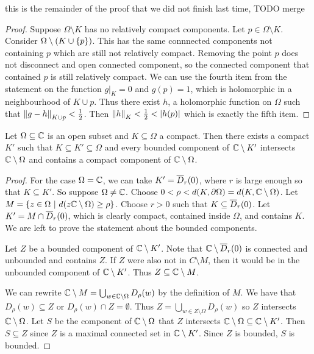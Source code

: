 
this is the remainder of the proof that we did not finish last time, TODO merge
\begin{proof}
    Suppose $\Omega \setminus K$ has no relatively compact components. Let $p \in \Omega \setminus K$. Consider $\Omega \setminus (K \cup \left\{p\right\})$. This has the same connnected components not containing $p$ which are still not relatively compact. Removing the point $p$ does not disconnect and open connected component, so the connected component that contained $p$ is still relatively compact. We can use the fourth item from the statement on the function $g|_K = 0$ and $g(p) = 1$, which is holomorphic in a neighbourhood of $K \cup p$. Thus there exist $h$, a holomorphic function on $\Omega$ such that $\left\lVert g - h\right\rVert_{K \cup p} < \frac{1}{2}$. Then $\left\lVert h\right\rVert_K < \frac{1}{2} < \left\lvert h(p)\right\rvert$ which is exactly the fifth item.
\end{proof}

\begin{lema}
    Let $\Omega \subseteq \mathbb{C}$ is an open subset and $K \subseteq \Omega$ a compact. Then there exists a compact $K'$ such that $K \subseteq K' \subseteq \Omega$ and every bounded component of $\mathbb{C} \setminus K'$ intersects $\mathbb{C} \setminus \Omega$ and contains a compact component of $\mathbb{C} \setminus \Omega$.
\end{lema}
\begin{proof}
    For the case $\Omega = \mathbb{C}$, we can take $K' = \overline{D}_r(0)$, where $r$ is large enough so that $K \subseteq K'$. So suppose $\Omega \neq \mathbb{C}$. Choose $0 < \rho < d(K, \partial{\Omega}) = d(K, \mathbb{C} \setminus \Omega)$. Let $M = \left\{z \in \Omega~\middle\vert~d(z \mathbb{C} \setminus \Omega) \geq \rho\right\}$. Choose $r > 0$ such that $K \subseteq \overline{D}_r(0)$. Let $K' = M \cap \overline{D}_r(0)$, which is clearly compact, contained inside $\Omega$, and contains $K$. We are left to prove the statement about the bounded components.

    Let $Z$ be a bounded component of $\mathbb{C} \setminus K'$. Note that $\mathbb{C} \setminus \overline{D}_r(0)$ is connected and unbounded and contains $Z$. If $Z$ were also not in $C \setminus M$, then it would be in the unbounded component of $\mathbb{C} \setminus K'$. Thus $Z \subseteq \mathbb{C} \setminus M$.  

    We can rewrite $\mathbb{C} \setminus M = \bigcup_{w \in \mathbb{C} \setminus \Omega} D_{\rho}(w)$ by the definition of $M$. We have that  $D_{\rho}(w) \subseteq Z$ or $D_{\rho}(w) \cap Z = \emptyset$. Thus $Z = \bigcup_{w \in Z \setminus \Omega} D_{\rho}(w)$ so $Z$ intersects $\mathbb{C} \setminus \Omega$. Let $S$ be the component of $\mathbb{C} \setminus \Omega$ that $Z$ intersects $\mathbb{C} \setminus \Omega \subseteq \mathbb{C} \setminus K'$. Then $S \subseteq Z$ since $Z$ is a maximal connected set in $\mathbb{C} \setminus K'$. Since $Z$ is bounded, $S$ is bounded.
\end{proof}

